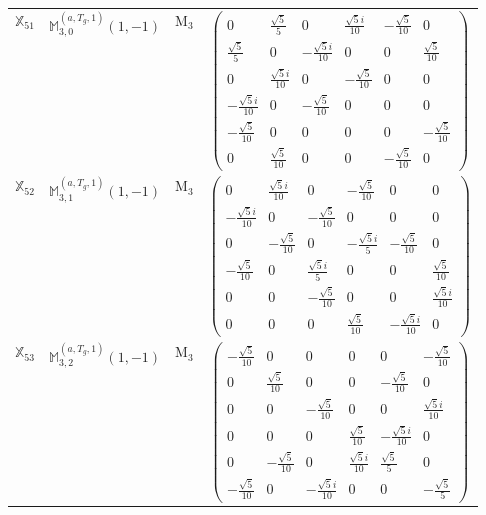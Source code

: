 \documentclass[fleqn,10pt,landscape]{article}
\begin{document}
\begin{itemize}
\begin{center}
\begin{longtable}{c|c|c|c}
$ \mathbb{X}_{51} $ & $\mathbb{M}_{3,0}^{(a,T_{g},1)}(1,-1)$ & M$_{3}$ & $\begin{pmatrix} 0 & \frac{\sqrt{5}}{5} & 0 & \frac{\sqrt{5} i}{10} & - \frac{\sqrt{5}}{10} & 0 \\ \frac{\sqrt{5}}{5} & 0 & - \frac{\sqrt{5} i}{10} & 0 & 0 & \frac{\sqrt{5}}{10} \\ 0 & \frac{\sqrt{5} i}{10} & 0 & - \frac{\sqrt{5}}{10} & 0 & 0 \\ - \frac{\sqrt{5} i}{10} & 0 & - \frac{\sqrt{5}}{10} & 0 & 0 & 0 \\ - \frac{\sqrt{5}}{10} & 0 & 0 & 0 & 0 & - \frac{\sqrt{5}}{10} \\ 0 & \frac{\sqrt{5}}{10} & 0 & 0 & - \frac{\sqrt{5}}{10} & 0 \end{pmatrix}$ \\
$ \mathbb{X}_{52} $ & $\mathbb{M}_{3,1}^{(a,T_{g},1)}(1,-1)$ & M$_{3}$ & $\begin{pmatrix} 0 & \frac{\sqrt{5} i}{10} & 0 & - \frac{\sqrt{5}}{10} & 0 & 0 \\ - \frac{\sqrt{5} i}{10} & 0 & - \frac{\sqrt{5}}{10} & 0 & 0 & 0 \\ 0 & - \frac{\sqrt{5}}{10} & 0 & - \frac{\sqrt{5} i}{5} & - \frac{\sqrt{5}}{10} & 0 \\ - \frac{\sqrt{5}}{10} & 0 & \frac{\sqrt{5} i}{5} & 0 & 0 & \frac{\sqrt{5}}{10} \\ 0 & 0 & - \frac{\sqrt{5}}{10} & 0 & 0 & \frac{\sqrt{5} i}{10} \\ 0 & 0 & 0 & \frac{\sqrt{5}}{10} & - \frac{\sqrt{5} i}{10} & 0 \end{pmatrix}$ \\
$ \mathbb{X}_{53} $ & $\mathbb{M}_{3,2}^{(a,T_{g},1)}(1,-1)$ & M$_{3}$ & $\begin{pmatrix} - \frac{\sqrt{5}}{10} & 0 & 0 & 0 & 0 & - \frac{\sqrt{5}}{10} \\ 0 & \frac{\sqrt{5}}{10} & 0 & 0 & - \frac{\sqrt{5}}{10} & 0 \\ 0 & 0 & - \frac{\sqrt{5}}{10} & 0 & 0 & \frac{\sqrt{5} i}{10} \\ 0 & 0 & 0 & \frac{\sqrt{5}}{10} & - \frac{\sqrt{5} i}{10} & 0 \\ 0 & - \frac{\sqrt{5}}{10} & 0 & \frac{\sqrt{5} i}{10} & \frac{\sqrt{5}}{5} & 0 \\ - \frac{\sqrt{5}}{10} & 0 & - \frac{\sqrt{5} i}{10} & 0 & 0 & - \frac{\sqrt{5}}{5} \end{pmatrix}$ \\

\end{longtable}
\end{center}
\end{itemize}
\end{document}
